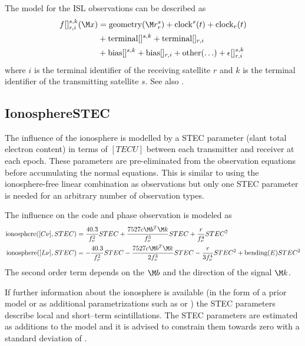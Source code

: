 The model for the ISL observations can be described as
\begin{equation}\label{gnssParametrizationType:islFullModel}
\begin{split}
  f[]_{r,i}^{s,k}(\M x) &= \text{geometry}(\M r_r^s) + \text{clock}^s(t) + \text{clock}_r(t) \\
               &+ \text{terminal}[]^{s,k}  + \text{terminal}[]_{r,i} \\
               &+ \text{bias}[]^{s,k} + \text{bias}[]_{r,i}
               + \text{other}(\ldots) + \epsilon[]_{r,i}^{s,k}
\end{split}
\end{equation}
where $ i $ is the terminal identifier of the receiving satellite $ r $ and $ k $ is the terminal identifier of the transmitting satellite $ s $.
See also .


\subsection{IonosphereSTEC}\label{gnssParametrizationType:ionosphereSTEC}
The influence of the ionosphere is modelled by a STEC parameter (slant total electron content)
in terms of $[TECU]$ between each transmitter and receiver at each epoch. These parameters are pre-eliminated
from the observation equations before accumulating the normal equations.
This is similar to using the ionosphere-free linear combination as observations
but only one STEC parameter is needed for an arbitrary number of observation types.

The influence on the code and phase observation is modeled as
\begin{equation}
\begin{split}
\text{ionosphere}([C\nu], STEC) &=  \frac{40.3}{f_{\nu}^2}STEC + \frac{7527 c \M b^T\M k}{f_{\nu}^3}STEC +  \frac{r}{f_{\nu}^4}STEC^2 \\
\text{ionosphere}([L\nu], STEC) &= -\frac{40.3}{f_{\nu}^2}STEC - \frac{7527 c \M b^T\M k}{2f_{\nu}^3}STEC - \frac{r}{3f_{\nu}^4}STEC^2 + \text{bending}(E)STEC^2
\end{split}
\label{gnssParametrizationType:IonosphereSTEC:STEC}
\end{equation}
The second order term depends on the  $\M b$
and the direction of the signal $\M k$.

If further information about the ionosphere is available
(in the form of a prior model or as additional parametrizations
such as  or
) the STEC
parameters describe local and short–term scintillations. The STEC parameters are estimated
as additions to the model and it is advised to constrain them towards zero
with a standard deviation of .


